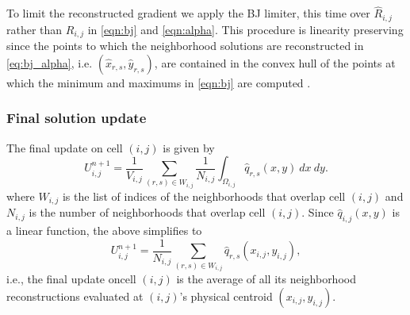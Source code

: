 
To limit the reconstructed gradient we apply the BJ limiter, this time over $\widehat{R}_{i,j}$ rather than $R_{i,j}$ in \eqref{eqn:bj} and \eqref{eqn:alpha}.  This procedure is linearity preserving since the points to which the neighborhood solutions are reconstructed in \eqref{eq:bj_alpha}, i.e. $(\widehat{x}_{r,s}, \widehat{y}_{r,s})$, are contained in the convex hull of the points at which the minimum and maximums in \eqref{eqn:bj} are computed \cite{giuliani2018analysis}.


\subsubsection*{Final solution update} 

The final update on cell $(i,j)$ is given by 
\begin{equation} \label{eqn:final_update_linear}
U^{n+1}_{i,j} =  \frac{1}{V_{i,j}}\sum_{(r,s) \in W_{i,j}}\frac{1}{N_{i,j}} \int_{\Omega_{i,j}}\widehat q_{r,s}(x,y) ~dx~dy.
\end{equation}
where $W_{i,j}$ is the list of indices of the neighborhoods that overlap cell $(i,j)$ and $N_{i,j}$ is the number of neighborhoods that overlap cell $(i,j)$. 
Since $\widehat{q}_{i,j}(x,y)$ is a linear function, the above simplifies to
\begin{equation} \label{eqn:final_update_linear2}
	U^{n+1}_{i,j} =   \frac{1}{N_{i,j}}\sum_{(r,s)  \in W_{i,j}}\hat{q}_{r,s}(x_{i,j},y_{i,j}),
\end{equation}
i.e., the final update oncell $(i,j)$ is the average of all its neighborhood reconstructions evaluated at $(i,j)$'s physical centroid $(x_{i,j},y_{i,j})$. 


